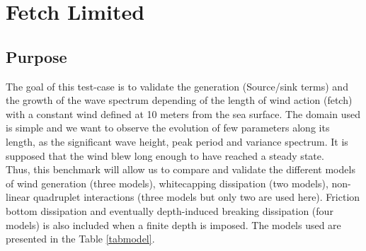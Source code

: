 
\section{Fetch Limited }

\subsection{Purpose}
The goal of this test-case is to validate the generation (Source/sink terms)  and the growth of the wave spectrum depending of the length of wind action (fetch) with a constant wind defined at 10 meters from the sea surface. The domain used is simple and we want to observe the evolution of few parameters along its length, as the significant wave height, peak period and variance spectrum.
It is supposed that the wind blew long enough to have reached a steady state.\\
Thus, this benchmark will allow us to compare and validate the different models of wind generation (three models), whitecapping dissipation (two models), non-linear quadruplet interactions (three models but only two are used here). Friction bottom dissipation and eventually depth-induced breaking dissipation (four models) is also included when a finite depth is imposed. The models used are presented in the Table \ref{tabmodel}.
